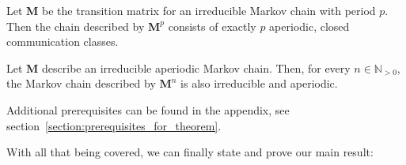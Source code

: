 \documentclass[../../main.tex]{subfiles}
\begin{document}
      \begin{lemma}
        \label{lemma:raising_marov_matrix_to_its_period}
        Let $\bm{M}$ be the transition matrix for an irreducible Markov chain with period $p$. Then the chain described by $\bm{M}^p$ consists of exactly $p$ aperiodic, closed communication classes.
    \end{lemma}

    \begin{lemma}
        \label{lemma:irreducible_aperiodic_markov_chain_stays_irreducible_aperiodic}
        Let $\bm{M}$ describe an irreducible aperiodic Markov chain. Then, for every $n \in \mathbb{N}_{>0}$, the Markov chain described by $\bm{M}^n$ is also irreducible and aperiodic.
    \end{lemma}

    Additional prerequisites can be found in the appendix, see section~\ref{section:prerequisites_for_theorem}.

    With all that being covered, we can finally state and prove our main result:
\end{document}
